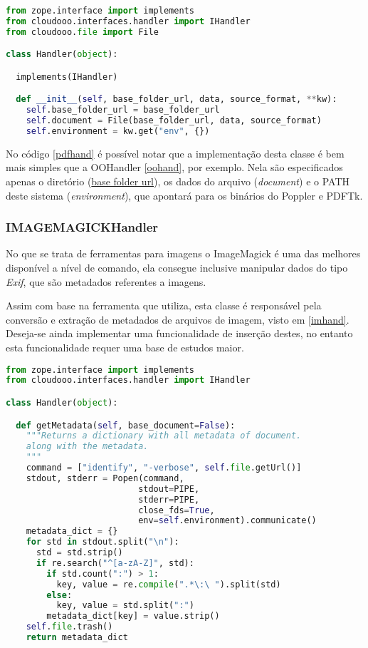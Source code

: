 {\singlespace
\begin{lstlisting}[caption=Trecho de criação da classe PDFHandler,language=python,label={pdfhand}]
from zope.interface import implements
from cloudooo.interfaces.handler import IHandler
from cloudooo.file import File

class Handler(object):

  implements(IHandler)

  def __init__(self, base_folder_url, data, source_format, **kw):
    self.base_folder_url = base_folder_url
    self.document = File(base_folder_url, data, source_format)
    self.environment = kw.get("env", {})
\end{lstlisting}
}

No código \ref{pdfhand} é possível notar que a implementação desta classe é bem mais simples que a OOHandler \ref{oohand}, por exemplo.
Nela são especificados apenas o diretório (\underline{base folder url}), os dados do arquivo (\textit{document}) e o PATH deste sistema (\textit{environment}), que apontará para os binários do Poppler e PDFTk.


\subsubsection{IMAGEMAGICKHandler}

No que se trata de ferramentas para imagens o ImageMagick é uma das melhores disponível a nível de comando, ela consegue inclusive manipular dados do tipo \textit{Exif}, que são metadados referentes a imagens.

Assim com base na ferramenta que utiliza, esta classe é responsável pela conversão e extração de metadados de arquivos de imagem, visto em \ref{imhand}. Deseja-se ainda implementar uma funcionalidade de inserção destes, no entanto esta funcionalidade requer uma base de estudos maior.

{\singlespace
\begin{lstlisting}[caption=Método getMetadata da classe IMAGEMAGICKHandler,language=python,label={imhand}]
from zope.interface import implements
from cloudooo.interfaces.handler import IHandler

class Handler(object):

  def getMetadata(self, base_document=False):
    """Returns a dictionary with all metadata of document.
    along with the metadata.
    """
    command = ["identify", "-verbose", self.file.getUrl()]
    stdout, stderr = Popen(command,
                          stdout=PIPE,
                          stderr=PIPE,
                          close_fds=True,
                          env=self.environment).communicate()
    metadata_dict = {}
    for std in stdout.split("\n"):
      std = std.strip()
      if re.search("^[a-zA-Z]", std):
        if std.count(":") > 1:
          key, value = re.compile(".*\:\ ").split(std)
        else:
          key, value = std.split(":")
        metadata_dict[key] = value.strip()
    self.file.trash()
    return metadata_dict
\end{lstlisting}
}


